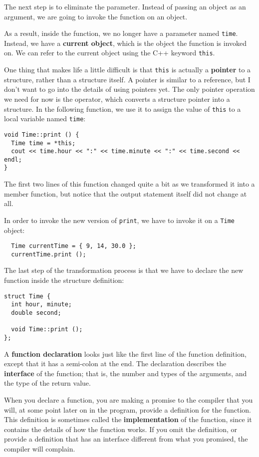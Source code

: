 The next step is to eliminate the parameter.  Instead of passing
an object as an argument, we are going to invoke the function
on an object.

As a result, inside the function, we no longer have a parameter named
{\tt time}.  Instead, we have a {\bf current object}, which is the
object the function is invoked on.  We can refer to the current object
using the C++ keyword {\tt this}.


One thing that makes life a little difficult is that {\tt this}
is actually a {\bf pointer} to a structure, rather than a structure
itself.  A pointer is similar to a reference, but I don't want
to go into the details of using pointers yet.  The only pointer
operation we need for now is the {\tt *} operator, which converts
a structure pointer into a structure.  In the following
function, we use it to assign the value of {\tt this} to a local
variable named {\tt time}:

\begin{verbatim}
void Time::print () {
  Time time = *this;
  cout << time.hour << ":" << time.minute << ":" << time.second << endl;
}
\end{verbatim}
%
The first two lines of this function changed quite a bit as we
transformed it into a member function, but notice that the output
statement itself did not change at all.

In order to invoke the new version of {\tt print}, we have
to invoke it on a {\tt Time} object:

\begin{verbatim}
  Time currentTime = { 9, 14, 30.0 };
  currentTime.print ();
\end{verbatim}
%
The last step of the transformation process is that we have to
declare the new function inside the structure definition:

\begin{verbatim}
struct Time {
  int hour, minute;
  double second;

  void Time::print ();
};
\end{verbatim}
%
A {\bf function declaration} looks just like the first line of the
function definition, except that it has a semi-colon at the end.  The
declaration describes the {\bf interface} of the function; that is,
the number and types of the arguments, and the type of the return
value.

When you declare a function, you are making a promise to the compiler
that you will, at some point later on in the program, provide a
definition for the function.  This definition is sometimes called
the {\bf implementation} of the function, since it contains the
details of how the function works.  If you omit the definition, or
provide a definition that has an interface different from what
you promised, the compiler will complain.

